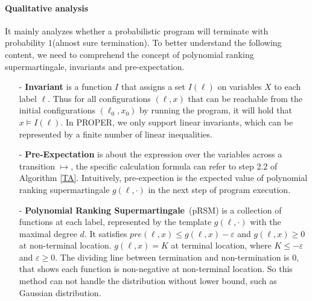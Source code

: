 \documentclass[runningheads]{llncs}
\begin{document}
\paragraph{Qualitative analysis} It mainly analyzes whether a probabilistic program will terminate with probability $1$(almost sure termination).
To better understand the following content, we need to comprehend the concept of polynomial ranking supermartingale, invariants and pre-expectation.
\begin{enumerate}
	\item[-] \textbf{Invariant} is a function $I$ that assigns a set $I(\ell)$ on variables $X$ to each label $\ell$. Thus for all configurations $(\ell,x)$ that can be reachable from the initial configurations $(\ell_0, x_0)$ by running the program, it will hold that $x \models I(\ell)$. In PROPER, we only support linear invariants, which can be represented by a finite number of linear inequalities.
	\item[-] \textbf{Pre-Expectation} is about the expression over the variables across a transition $\mapsto$, the specific calculation formula can refer to step 2.2 of  Algorithm \ref{TA}. Intuitively, pre-expection is the expected value of polynomial ranking  supermartingale $g(\ell,\cdot)$ in the next step of program execution.
	\item[-] \textbf{Polynomial Ranking Supermartingale}~\cite{Chakarov2013Martingales}(pRSM) is a collection of functions at each label, represented by the template $g(\ell,\cdot)$ with the maximal degree $d$. It satisfies $pre(\ell,x)\leq g(\ell,x)-\varepsilon$ and $g(\ell,x)\geq 0$ at non-terminal location. $g(\ell,x)=K$ at terminal location, where $K\leq -\varepsilon$ and $\varepsilon\geq 0$. The dividing line between termination and non-termination is 0, that shows each function is non-negative at non-terminal location. So this method can not handle the distribution without lower bound, such as Gaussian distribution. 
\end{enumerate}
\end{document}

